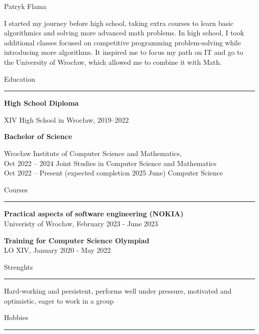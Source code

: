 \documentclass{letter}
\begin{document}
\hfill
\begin{minipage}[t]{0.60\textwidth}
\setlength{\baselineskip}{1.5\baselineskip}
\vspace{0.8cm}
{\huge Patryk Flama}

\vspace{0.3cm}

\begin{spacing}{1.125}
\small 
I started my journey before high school, taking extra courses to learn basic algorithmics and solving more advanced math problems. In high school, I took additional classes focused on competitive programming problem-solving while introducing more algorithms. It inspired me to focus my path on IT and go to the University of Wrocław, which allowed me to combine it with Math.
\end{spacing}

\vspace{0.3cm}

{\large Education}
\rule{\linewidth}{0.4pt}

{\large \textbf{High School Diploma}}

{\small XIV High School in Wrocław, 2019--2022}

{\large \textbf{Bachelor of Science}}

{\small Wrocław Institute of Computer Science and Mathematics, \\
Oct 2022 -- 2024 Joint Studies in Computer Science and Mathematics \\
Oct 2022 -- Present (expected completion 2025 June) Computer Science}

\vspace{0.3cm}

{\large Courses}
\rule{\linewidth}{0.4pt}

\textbf{Practical aspects of software engineering (NOKIA)} \\
{\small Univeristy of Wrocław, February 2023 - June 2023}

\textbf{Training for Computer Science Olympiad} \\
{\small  LO XIV, January 2020 - May 2022}

\vspace{0.3cm}

{\large Strenghts}
\rule{\linewidth}{0.4pt}
Hard-working and persistent, performs well under pressure, motivated and optimistic, eager to work in a group

\vspace{0.3cm}

{\large Hobbies}
\rule{\linewidth}{0.4pt}


\end{minipage}
\end{document}
